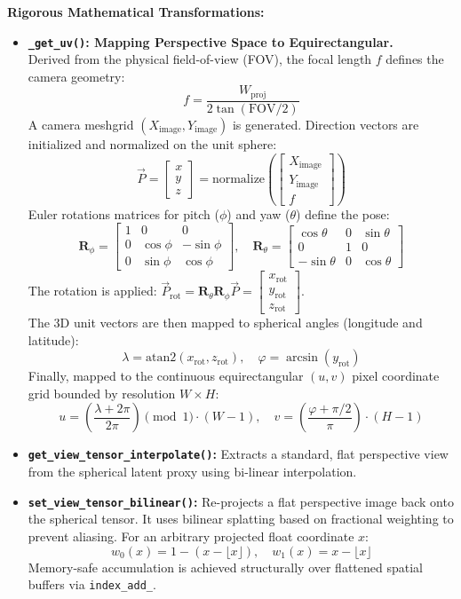 \documentclass[11pt,a4paper]{article}
\begin{document}
\textbf{Rigorous Mathematical Transformations:}
\begin{itemize}
    \item \textbf{\texttt{\_get\_uv()}: Mapping Perspective Space to Equirectangular.} \\
    Derived from the physical field-of-view (FOV), the focal length $f$ defines the camera geometry:
    \[ f = \frac{W_{\text{proj}}}{2 \tan(\text{FOV} / 2)} \]
    A camera meshgrid $(X_{\text{image}}, Y_{\text{image}})$ is generated. Direction vectors are initialized and normalized on the unit sphere:
    \[ \vec{P} = \begin{bmatrix} x \\ y \\ z \end{bmatrix} = \text{normalize}\left( \begin{bmatrix} X_{\text{image}} \\ Y_{\text{image}} \\ f \end{bmatrix} \right) \]
    Euler rotations matrices for pitch ($\phi$) and yaw ($\theta$) define the pose:
    \[ \mathbf{R}_{\phi} = \begin{bmatrix} 1 & 0 & 0 \\ 0 & \cos\phi & -\sin\phi \\ 0 & \sin\phi & \cos\phi \end{bmatrix}, \quad \mathbf{R}_{\theta} = \begin{bmatrix} \cos\theta & 0 & \sin\theta \\ 0 & 1 & 0 \\ -\sin\theta & 0 & \cos\theta \end{bmatrix} \]
    The rotation is applied: $\vec{P}_{\text{rot}} = \mathbf{R}_{\theta} \mathbf{R}_{\phi} \vec{P} = \begin{bmatrix} x_{\text{rot}} \\ y_{\text{rot}} \\ z_{\text{rot}} \end{bmatrix}$. \\
    The 3D unit vectors are then mapped to spherical angles (longitude and latitude):
    \[ \lambda = \text{atan2}(x_{\text{rot}}, z_{\text{rot}}), \quad \varphi = \arcsin(y_{\text{rot}}) \]
    Finally, mapped to the continuous equirectangular $(u, v)$ pixel coordinate grid bounded by resolution $W \times H$:
    \[ u = \left( \frac{\lambda + 2\pi}{2\pi} \right) \pmod{1} \cdot (W-1), \quad v = \left( \frac{\varphi + \pi/2}{\pi} \right) \cdot (H-1) \]
    \item \textbf{\texttt{get\_view\_tensor\_interpolate()}:} Extracts a standard, flat perspective view from the spherical latent proxy using bi-linear interpolation.
    \item \textbf{\texttt{set\_view\_tensor\_bilinear()}:} Re-projects a flat perspective image back onto the spherical tensor. It uses bilinear splatting based on fractional weighting to prevent aliasing. For an arbitrary projected float coordinate $x$:
    \[ w_0(x) = 1 - (x - \lfloor x \rfloor), \quad w_1(x) = x - \lfloor x \rfloor \]
    Memory-safe accumulation is achieved structurally over flattened spatial buffers via \texttt{index\_add\_}.
\end{itemize}
\end{document}
